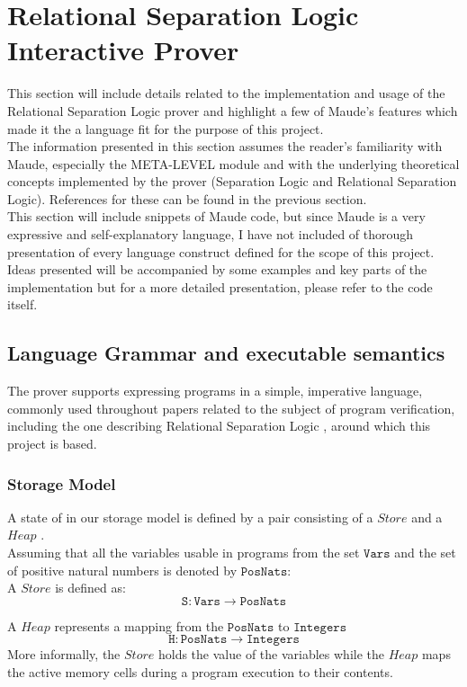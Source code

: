 \documentclass[12pt,a4paper]{article}
\begin{document}
\section{Relational Separation Logic Interactive Prover} 
This section will include details related to the implementation and usage of the Relational Separation Logic prover and highlight a few of Maude's features which made it the a language fit for the purpose of this project.
\\

The information presented in this section assumes the reader's familiarity with Maude, especially the META-LEVEL module and with the underlying theoretical concepts implemented by the prover (Separation Logic and Relational Separation Logic). References for these can be found in the previous section.
\\

This section will include snippets of Maude code, but since Maude is a very expressive and self-explanatory language, I have not included of thorough presentation of every language construct defined for the scope of this project. Ideas presented will be accompanied by some examples and key parts of the implementation but for a more detailed presentation, please refer to the code itself.
\subsection{Language Grammar and executable semantics}
The prover supports expressing programs in a simple, imperative language, commonly used throughout papers  \cite{primer} \cite{SeparationLogic} related to the subject of program verification, including the one describing Relational Separation Logic \cite{relational}, around  which this project is based. 
\subsubsection{Storage Model}
A state of in our storage model is defined by a pair consisting of a \(Store\) and a \(Heap\) .
\\
Assuming that all the variables usable in programs from the set \(\mathtt{Vars}\) and the set of positive natural numbers is denoted by \(\mathtt{PosNats}\): \\

A \(Store\) is defined as:
\[ \mathtt{S} : \mathtt{Vars} \rightarrow \mathtt{PosNats} \]

A \(Heap\) represents a mapping from the \(\mathtt{PosNats}\) to \(\mathtt{Integers}\)
\[ \mathtt{H} : \mathtt{PosNats} \rightarrow \mathtt{Integers} \] 
More informally, the \(Store\) holds the value of the variables while the \(Heap\) maps the active memory cells during a program execution to their contents.
\end{document}

